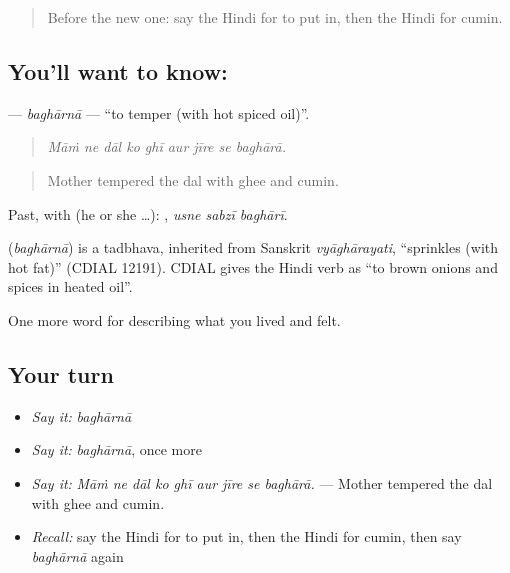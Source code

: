 \label{lesson:HI-C521-bagharna}



\begin{quote}
Before the new one: say the Hindi for to put in, then the Hindi for cumin.
\end{quote}

\subsection*{You'll want to know: }
\textbf{} — \emph{baghārnā} — \textquotedblleft{}to temper (with hot spiced oil)\textquotedblright{}.

\begin{quote}
        
\end{quote}

\begin{quote}
\emph{Māṁ ne dāl ko ghī aur jīre se baghārā.}
\end{quote}

\begin{quote}
Mother tempered the dal with ghee and cumin.
\end{quote}

Past, with  (he or she …):   , \emph{usne sabzī baghārī}.

\begin{cousinweb}
\textbf{} (\emph{baghārnā}) is a tadbhava, inherited from Sanskrit \emph{vyāghārayati}, \textquotedblleft{}sprinkles (with hot fat)\textquotedblright{} (CDIAL 12191). CDIAL gives the Hindi verb as \textquotedblleft{}to brown onions and spices in heated oil\textquotedblright{}.
\end{cousinweb}

\begin{grammarlens}[title={What you've built}]
One more word for describing what you lived and felt.
\end{grammarlens}

\subsection*{Your turn}
\begin{itemize}
\raggedright
  \item \emph{Say it:} \emph{baghārnā}
  \item \emph{Say it:} \emph{baghārnā}, once more
  \item \emph{Say it:} \emph{Māṁ ne dāl ko ghī aur jīre se baghārā.} — Mother tempered the dal with ghee and cumin.
  \item \emph{Recall:} say the Hindi for to put in, then the Hindi for cumin, then say \emph{baghārnā} again
\end{itemize}

